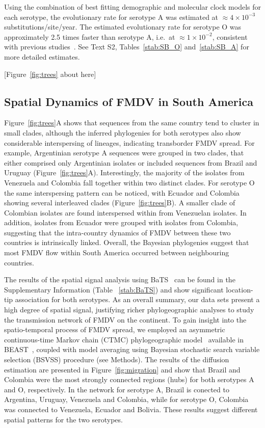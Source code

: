 \documentclass[10pt]{article}
\begin{document}
Using the combination of best fitting demographic and molecular clock models for each serotype, the evolutionary rate for serotype A was estimated at $\approx 4 \times 10^{-3}$ substitutions/site/year.
The estimated evolutionary rate for serotype O was approximately 2.5 times faster than serotype A, i.e.~at $\approx 1 \times 10^{-2}$, consistent with previous studies~\cite{tully, Carvalho2013, Muellner2011}.
See Text S2, Tables~\ref{stab:SB_O} and~\ref{stab:SB_A} for more detailed estimates.

\begin{center}
 [Figure~\ref{fig:trees} about here]
\end{center}

\subsection*{Spatial Dynamics of FMDV in South America}

Figure~\ref{fig:trees}A shows that sequences from the same country tend to cluster in small clades, although the inferred phylogenies for both serotypes also show considerable interspersing of lineages, indicating transborder FMDV spread.
For example, Argentinian serotype A sequences were grouped in two clades, that either comprised only Argentinian isolates or included sequences from Brazil and Uruguay (Figure~\ref{fig:trees}A).
Interestingly, the majority of the isolates from Venezuela and Colombia fall together within two distinct clades.
For serotype O the same interspersing pattern can be noticed, with Ecuador and Colombia showing several interleaved clades (Figure~\ref{fig:trees}B).
A smaller clade of Colombian isolates are found interspersed within from Venezuelan isolates.
In addition, isolates from Ecuador were grouped with isolates from Colombia, suggesting that the intra-country dynamics of FMDV between these two countries is intrinsically linked.
Overall, the Bayesian phylogenies suggest that most FMDV flow within South America occurred between neighbouring countries. 

The results of the spatial signal analysis using BaTS~\cite{bats} can be found in the Supplementary Information (Table ~\ref{stab:BaTS}) and show significant location-tip association for both serotypes.
As an overall summary, our data sets present a high degree of spatial signal, justifying richer phylogeographic analyses to study the transmission network of FMDV on the continent.
To gain insight into the spatio-temporal process of FMDV spread, we employed an asymmetric continuous-time Markov chain (CTMC) phylogeographic model~\cite{roots} available in BEAST~\cite{beast2012}, coupled  with model averaging using Bayesian stochastic search variable selection (BSVSS) procedure (see Methods).
The results of the diffusion estimation are presented in Figure~\ref{fig:migration} and show that Brazil and Colombia were the most strongly connected regions (hubs) for both serotypes A and O, respectively. 
In the network for serotype A, Brazil is conected to Argentina, Uruguay, Venezuela and Colombia, while for serotype O, Colombia was connected to Venezuela, Ecuador and Bolivia.
These results suggest different spatial patterns for the two serotypes.
\end{document}
